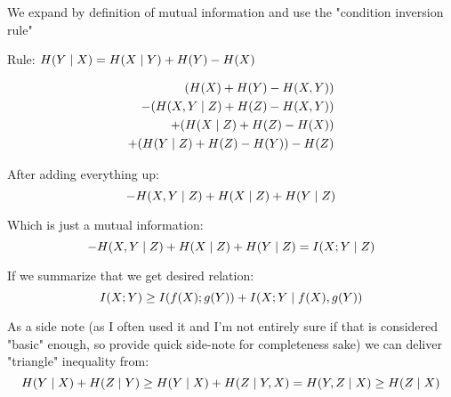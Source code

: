 We expand by definition of mutual information and use
the "condition inversion rule"

Rule: $\pre{Y}[X] = \pre{X}[Y] + \pre{Y} - \pre{X}$


\begin{align*}
(\pre{X} + \pre{Y} - \pre{X,Y}) \\
- (\pre{X,Y}[Z] + \pre{Z} - \pre{X,Y}) \\
+ (\pre{X}[Z] + \pre{Z} - \pre{X}) \\
+ (\pre{Y}[Z] + \pre{Z} - \pre{Y}) - \pre{Z}
\end{align*}

After adding everything up:
\begin{equation}
-\pre{X,Y}[Z] + \pre{X}[Z] + \pre{Y}[Z]
\end{equation}

Which is just a mutual information:
\begin{equation}
-\pre{X,Y}[Z] + \pre{X}[Z] + \pre{Y}[Z] = \pri{X;Y}[Z]
\end{equation}


If we summarize that we get desired relation:
\begin{equation}
\pri{X;Y} \geq \pri{f(X); g(Y)} + \pri{X;Y}[f(X), g(Y)]
\end{equation}

As a side note (as I often used it and I'm not entirely sure if that is considered "basic" enough, so provide quick side-note for completeness sake) we can deliver "triangle" inequality from:
\begin{equation}
\pre{Y}[X] + \pre{Z}[Y] \geq \pre{Y}[X] + \pre{Z}[Y,X] = \pre{Y,Z}[X] \geq \pre{Z}[X]
\end{equation}


